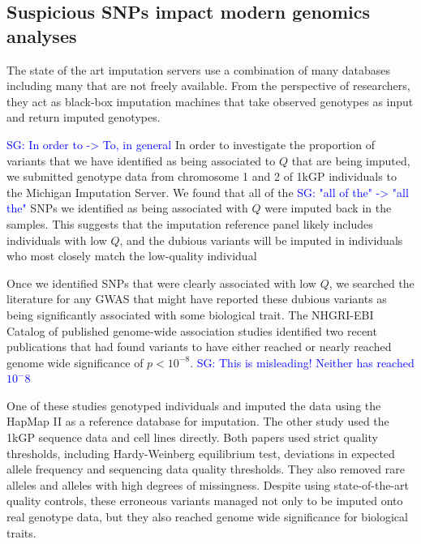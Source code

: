 \documentclass[9pt,lineno]{elife}
\newcommand{\sgcomment}[1]{\textcolor{blue}{SG: #1}}
\begin{document}
\subsection{Suspicious SNPs impact modern genomics analyses}
The state of the art imputation servers use a combination of many databases including many that are not freely available.
From the perspective of researchers, they act as black-box imputation machines that take observed genotypes as input and return imputed genotypes.  


\sgcomment{In order to -> To, in general} In order to investigate the proportion of variants that we have identified as being associated to $Q$ that are being imputed, we submitted genotype data from chromosome 1 and 2 of 1kGP individuals to the Michigan Imputation Server.
We found that all of the \sgcomment{"all of the" -> "all the" } SNPs we identified as being associated with $Q$ were imputed back in the samples. 
This suggests that the imputation reference panel likely includes individuals with low $Q$, and the dubious variants will be imputed in individuals who most closely match the low-quality individual

Once we identified SNPs that were clearly associated with low $Q$, we searched the literature for any GWAS that might have reported these dubious variants as being significantly associated with some biological trait. 
The NHGRI-EBI Catalog of published genome-wide association studies identified two recent publications that had found variants to have either reached or nearly reached genome wide significance of $ p < 10^{-8}$. \sgcomment{This is misleading! Neither has reached $10^-8$}

One of these studies genotyped individuals and imputed the data using the HapMap II as a reference  database for imputation.
The other study used the 1kGP sequence data and cell lines directly.
Both papers used strict quality thresholds, including Hardy-Weinberg equilibrium test, deviations in expected allele frequency and sequencing data quality thresholds. 
They also removed rare alleles and alleles with high degrees of missingness. 
Despite using state-of-the-art quality controls, these erroneous variants managed not only to be imputed onto real genotype data, but they also reached genome wide significance for biological traits.
\end{document}
